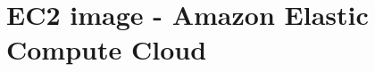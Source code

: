 \chapter{EC2 image - Amazon Elastic Compute Cloud}
\label{chapter:ec2}
\minitoc

%
%  
%
%
%
%
%
%
%
%
%
% 
%
%
%
%
%
%
%
%  
%
%
%
%
%
